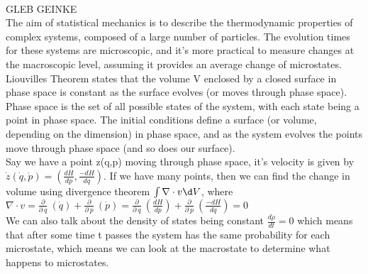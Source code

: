 \\GLEB GEINKE
\\The aim of statistical mechanics is to describe the thermodynamic properties of complex systems, composed of a large number of particles. The evolution times for these systems are microscopic, and it’s more practical to measure changes at the macroscopic level, assuming it provides an average change of microstates.\\
Liouvilles Theorem states that the volume V enclosed by a closed surface in phase space is constant as the surface evolves (or moves through phase space). \\
Phase space is the set of all possible states of the system, with each state being a point in phase space. The initial conditions define a surface (or volume, depending on the dimension) in phase space, and as the system evolves the points move through phase space (and so does our surface). \\
Say we have a point z(q,p) moving through phase space, it’s velocity is given by $\dot z (\dot q,\dot p)=(\frac{dH}{dp}, \frac{-dH}{dq})$. If we have many points, then we can find the change in volume using divergence theorem $\int\nabla\cdot v\d V$, where $\nabla\cdot v=\frac{\partial}{\partial\ q}\ (\dot q)+\frac{\partial}{\partial\ p}\ (\dot p)=\frac{\partial}{\partial\ q}\ (\frac{dH}{dp})+\frac{\partial}{\partial\ p}\ (\frac{-dH}{dq})=0$\\ 

We can also talk about the density of states being constant $\frac{d\rho}{dt} = 0$ which means that after some time t passes the system has the same probability for each microstate, which means we can look at the macrostate to determine what happens to microstates. 
